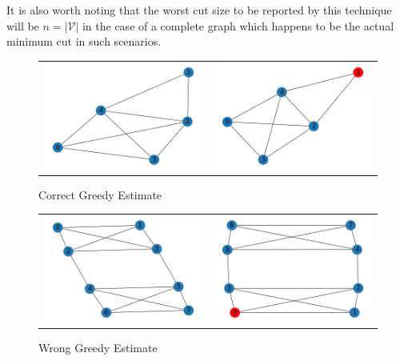 \documentclass[longpaper, english, final, times]{revdetua}
\begin{document}
		It is also worth noting that the worst cut size to be reported by this technique will be $n=|\mathcal{V}|$ in the case of a complete graph which happens to be the actual minimum cut in such scenarios.
		
		\begin{figure}[h]
			\begin{tabular}{cc}
				\includegraphics[width=0.5\linewidth]{imgs/greedyexx1.png} &   \includegraphics[width=0.5\linewidth]{imgs/greedyexx2.png} \\
			\end{tabular}
			\caption{Correct Greedy Estimate}
			\label{figure:greedysearchcorrect1}
		\end{figure}
			
		\begin{figure}[h]
			\begin{tabular}{cc}
				\includegraphics[width=0.5\linewidth]{imgs/greedycont1.png} &   \includegraphics[width=0.5\linewidth]{imgs/greedycont2.png} \\
			\end{tabular}
			\caption{Wrong Greedy Estimate}
			\label{figure:greedysearchwrong1}
		\end{figure}
		
\end{document}
